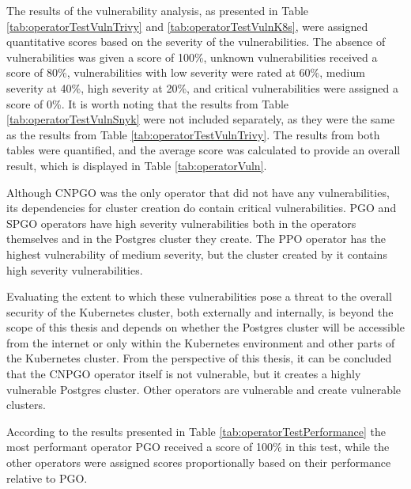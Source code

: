 The results of the vulnerability analysis, as presented in Table \ref{tab:operatorTestVulnTrivy} and \ref{tab:operatorTestVulnK8s}, were assigned quantitative scores based on the severity of the vulnerabilities. The absence of vulnerabilities was given a score of 100\%, unknown vulnerabilities received a score of 80\%, vulnerabilities with low severity were rated at 60\%, medium severity at 40\%, high severity at 20\%, and critical vulnerabilities were assigned a score of 0\%. It is worth noting that the results from Table \ref{tab:operatorTestVulnSnyk} were not included separately, as they were the same as the results from Table \ref{tab:operatorTestVulnTrivy}.
The results from both tables were quantified, and the average score was calculated to provide an overall result, which is displayed in Table \ref{tab:operatorVuln}.

Although CNPGO was the only operator that did not have any vulnerabilities, its dependencies for cluster creation do contain critical vulnerabilities. PGO and SPGO operators have high severity vulnerabilities both in the operators themselves and in the Postgres cluster they create. The PPO operator has the highest vulnerability of medium severity, but the cluster created by it contains high severity vulnerabilities.

Evaluating the extent to which these vulnerabilities pose a threat to the overall security of the Kubernetes cluster, both externally and internally, is beyond the scope of this thesis and depends on whether the Postgres cluster will be accessible from the internet or only within the Kubernetes environment and other parts of the Kubernetes cluster.
From the perspective of this thesis, it can be concluded that the CNPGO operator itself is not vulnerable, but it creates a highly vulnerable Postgres cluster. Other operators are vulnerable and create vulnerable clusters.


According to the results presented in Table \ref{tab:operatorTestPerformance} the most performant operator PGO received a score of 100\% in this test, while the other operators were assigned scores proportionally based on their performance relative to PGO.

